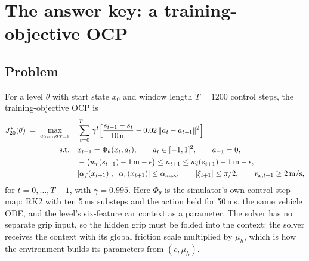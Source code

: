 \section{The answer key: a training-objective OCP}
\label{sec:answer}

\subsection{Problem}
\label{sec:answer-problem}

For a level $\theta$ with start state $x_0$ and window length $T = 1200$ control steps,
the training-objective OCP is
\begin{equation}
\begin{aligned}
  J^{*}_{20}(\theta) \;=\; \max_{a_0,\dots,a_{T-1}} \quad
    & \sum_{t=0}^{T-1} \gamma^{t}\Big[\frac{s_{t+1}-s_t}{10\,\text{m}}
      - 0.02\,\lVert a_t - a_{t-1}\rVert^2\Big] \\
  \text{s.t.}\quad
    & x_{t+1} = \Phi_\theta(x_t, a_t), \qquad a_t \in [-1,1]^2, \qquad a_{-1} = 0, \\
    & -\big(w_r(s_{t+1}) - 1\,\text{m} - \epsilon\big) \le n_{t+1}
      \le w_l(s_{t+1}) - 1\,\text{m} - \epsilon, \\
    & |\alpha_f(x_{t+1})|,\ |\alpha_r(x_{t+1})| \le \alpha_{\max}, \qquad
      |\xi_{t+1}| \le \pi/2, \qquad v_{x,t+1} \ge 2\,\text{m/s},
\end{aligned}
\label{eq:toocp}
\end{equation}
for $t = 0, \dots, T-1$, with $\gamma = 0.995$.
Here $\Phi_\theta$ is the simulator's own control-step map: RK2 with ten 5\,ms substeps
and the action held for 50\,ms, the same vehicle ODE, and the level's six-feature car
context as a parameter. The solver has no separate grip input, so the hidden grip must
be folded into the context: the solver receives the context with its global friction
scale multiplied by $\mu_h$, which is how the environment builds its parameters from
$(c, \mu_h)$.
